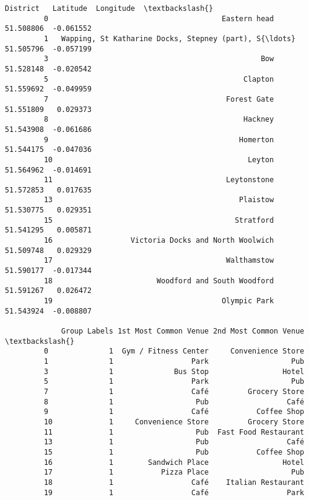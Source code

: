 \documentclass[11pt]{article}
\begin{document}
\begin{Verbatim}[commandchars=\\\{\}]
                                                      District   Latitude  Longitude  \textbackslash{}
         0                                        Eastern head  51.508806  -0.061552   
         1   Wapping, St Katharine Docks, Stepney (part), S{\ldots}  51.505796  -0.057199   
         3                                                 Bow  51.528148  -0.020542   
         5                                             Clapton  51.559692  -0.049959   
         7                                         Forest Gate  51.551809   0.029373   
         8                                             Hackney  51.543908  -0.061686   
         9                                            Homerton  51.544175  -0.047036   
         10                                             Leyton  51.564962  -0.014691   
         11                                        Leytonstone  51.572853   0.017635   
         13                                           Plaistow  51.530775   0.029351   
         15                                          Stratford  51.541295   0.005871   
         16                  Victoria Docks and North Woolwich  51.509748   0.029329   
         17                                        Walthamstow  51.590177  -0.017344   
         18                        Woodford and South Woodford  51.591267   0.026472   
         19                                       Olympic Park  51.543924  -0.008807   
         
             Group Labels 1st Most Common Venue 2nd Most Common Venue  \textbackslash{}
         0              1  Gym / Fitness Center     Convenience Store   
         1              1                  Park                   Pub   
         3              1              Bus Stop                 Hotel   
         5              1                  Park                   Pub   
         7              1                  Café         Grocery Store   
         8              1                   Pub                  Café   
         9              1                  Café           Coffee Shop   
         10             1     Convenience Store         Grocery Store   
         11             1                   Pub  Fast Food Restaurant   
         13             1                   Pub                  Café   
         15             1                   Pub           Coffee Shop   
         16             1        Sandwich Place                 Hotel   
         17             1           Pizza Place                   Pub   
         18             1                  Café    Italian Restaurant   
         19             1                  Café                  Park   
         

\end{Verbatim}
\end{document}

